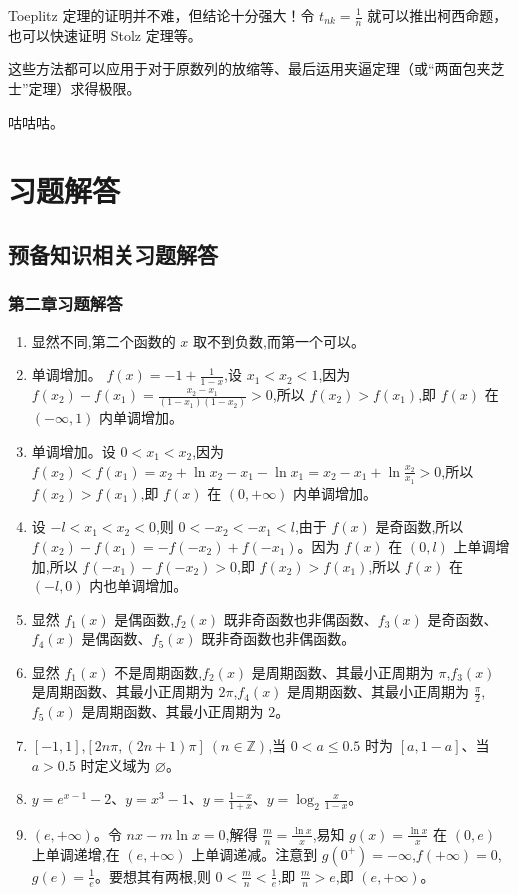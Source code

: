 \documentclass[lang=cn,10pt,twoside]{elegantbook}
\begin{document}
Toeplitz 定理的证明并不难，但结论十分强大！令 $t_{nk} = \frac 1n$ 就可以推出柯西命题，也可以快速证明 Stolz 定理等。

这些方法都可以应用于对于原数列的放缩等、最后运用夹逼定理（或“两面包夹芝士”定理）求得极限。
\newpage
\begin{problemset}
  \item 咕咕咕。
\end{problemset}
\chapter{习题解答}
\section{预备知识相关习题解答}
\subsection{第二章习题解答}
\begin{enumerate}
\item 显然不同,第二个函数的 $x$ 取不到负数,而第一个可以。
\item 单调增加。 $f(x) = -1 + \frac1{1-x}$,设 $x_1 < x_2 < 1$,因为 $f(x_2) - f(x_1) = \frac{x_2-x_1}{(1-x_1)(1-x_2)} > 0$,所以 $f(x_2) > f(x_1)$,即 $f(x)$ 在 $(-\infty, 1)$ 内单调增加。
\item 单调增加。设 $0 < x_1 < x_2$,因为 $f(x_2) < f(x_1) = x_2 + \ln x_2 - x_1 - \ln x_1 = x_2 - x_1 + \ln \frac{x_2}{x_1} > 0$,所以 $f(x_2) > f(x_1)$,即 $f(x)$ 在 $(0, +\infty)$ 内单调增加。
\item 设 $-l < x_1 < x_2 < 0$,则 $0 < -x_2 < -x_1 < l$,由于 $f(x)$ 是奇函数,所以 $f(x_2) - f(x_1) = -f(-x_2) + f(-x_1)$。因为 $f(x)$ 在 $(0, l)$ 上单调增加,所以 $f(-x_1) - f(-x_2) > 0$,即 $f(x_2) > f(x_1)$,所以 $f(x)$ 在 $(-l, 0)$ 内也单调增加。
\item 显然 $f_1(x)$ 是偶函数,$f_2(x)$ 既非奇函数也非偶函数、$f_3(x)$ 是奇函数、$f_4(x)$ 是偶函数、$f_5(x)$ 既非奇函数也非偶函数。
\item 显然 $f_1(x)$ 不是周期函数,$f_2(x)$ 是周期函数、其最小正周期为 $\pi$,$f_3(x)$ 是周期函数、其最小正周期为 $2\pi$,$f_4(x)$ 是周期函数、其最小正周期为 $\frac{\pi}2$,$f_5(x)$ 是周期函数、其最小正周期为 $2$。
\item $[-1, 1]$,$[2n \pi, (2n+1) \pi]\ (n \in \mathbb{Z})$,当 $0 < a \leq 0.5$ 时为 $[a, 1-a]$、当 $a > 0.5$ 时定义域为 $\varnothing$。
\item $y = e^{x-1}-2$、$y=x^3-1$、$y=\frac{1-x}{1+x}$、$y = \log_2 \frac{x}{1-x}$。
\item $(e, +\infty)$。令 $nx - m \ln x = 0$,解得 $\frac m n = \frac{\ln x}x$,易知 $g(x) = \frac{\ln x}{x}$ 在 $(0, e)$ 上单调递增,在 $(e, +\infty)$ 上单调递减。注意到 $g(0^+) = -\infty$,$f(+\infty) = 0$,$g(e) = \frac 1e$。要想其有两根,则 $0 < \frac m n < \frac 1e$,即 $\frac m n > e$,即 $(e, +\infty)$。
\end{enumerate}
\end{document}

